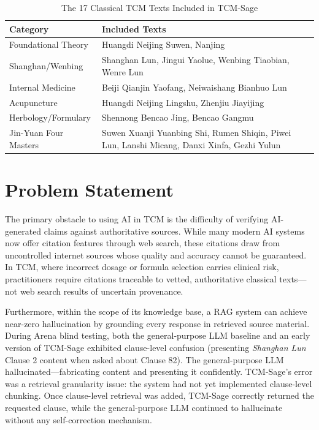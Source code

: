 \documentclass[11pt,a4paper]{report}
\begin{document}
\begin{table}[H]
\centering
\caption{The 17 Classical TCM Texts Included in TCM-Sage}
\begin{tabularx}{\textwidth}{lX}
\toprule
\textbf{Category} & \textbf{Included Texts} \\
\midrule
Foundational Theory & Huangdi Neijing Suwen, Nanjing \\
Shanghan/Wenbing & Shanghan Lun, Jingui Yaolue, Wenbing Tiaobian, Wenre Lun \\
Internal Medicine & Beiji Qianjin Yaofang, Neiwaishang Bianhuo Lun \\
Acupuncture & Huangdi Neijing Lingshu, Zhenjiu Jiayijing \\
Herbology/Formulary & Shennong Bencao Jing, Bencao Gangmu \\
Jin-Yuan Four Masters & Suwen Xuanji Yuanbing Shi, Rumen Shiqin, Piwei Lun, Lanshi Micang, Danxi Xinfa, Gezhi Yulun \\
\bottomrule
\end{tabularx}
\label{tab:texts}
\end{table}

\section{Problem Statement}
The primary obstacle to using AI in TCM is the difficulty of verifying AI-generated claims against authoritative sources. While many modern AI systems now offer citation features through web search, these citations draw from uncontrolled internet sources whose quality and accuracy cannot be guaranteed. In TCM, where incorrect dosage or formula selection carries clinical risk, practitioners require citations traceable to vetted, authoritative classical texts---not web search results of uncertain provenance.

Furthermore, within the scope of its knowledge base, a RAG system can achieve near-zero hallucination by grounding every response in retrieved source material. During Arena blind testing, both the general-purpose LLM baseline and an early version of TCM-Sage exhibited clause-level confusion (presenting \textit{Shanghan Lun} Clause 2 content when asked about Clause 82). The general-purpose LLM hallucinated---fabricating content and presenting it confidently. TCM-Sage's error was a retrieval granularity issue: the system had not yet implemented clause-level chunking. Once clause-level retrieval was added, TCM-Sage correctly returned the requested clause, while the general-purpose LLM continued to hallucinate without any self-correction mechanism.
\end{document}
